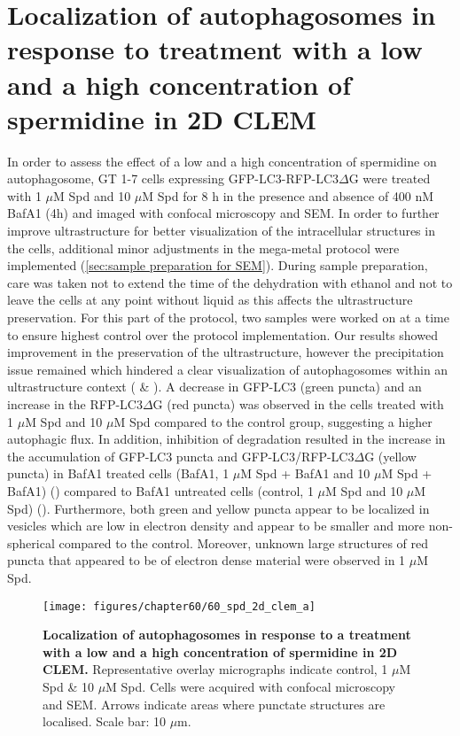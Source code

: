 \section{Localization of autophagosomes in response to treatment with a low and a high concentration of spermidine in 2D CLEM}\label{sec:localization_autophagosomes_low_high_spermidine_2DCLEM}
In order to assess the effect of a low and a high concentration of spermidine on autophagosome, GT 1-7 cells expressing GFP-LC3-RFP-LC3$\Delta$G were treated with 1 $\mu$M Spd and 10 $\mu$M Spd for 8 h in the presence and absence of 400 nM BafA1 (4h) and imaged with confocal microscopy and SEM. In order to further improve ultrastructure for better visualization of the intracellular structures in the cells, additional minor adjustments in the mega-metal protocol were implemented (\cref{sec:sample preparation for SEM}). During sample preparation, care was taken not to extend the time of the dehydration with ethanol and not to leave the cells at any point without liquid as this affects the ultrastructure preservation. For this part of the protocol, two samples were worked on at a time to ensure highest control over the protocol implementation. Our results showed improvement in the preservation of the ultrastructure, however the precipitation issue remained which hindered a clear visualization of autophagosomes within an ultrastructure context ( \& ). A decrease in GFP-LC3 (green puncta) and an increase in the RFP-LC3$\Delta$G (red puncta) was observed in the cells treated with 1 $\mu$M Spd and 10 $\mu$M Spd compared to the control group, suggesting a higher autophagic flux. In addition, inhibition of degradation resulted in the increase in the accumulation of GFP-LC3 puncta and GFP-LC3/RFP-LC3$\Delta$G (yellow puncta) in BafA1 treated cells (BafA1, 1 $\mu$M Spd + BafA1 and 10 $\mu$M Spd + BafA1) () compared to BafA1 untreated cells (control, 1 $\mu$M Spd and 10 $\mu$M Spd) (). Furthermore, both green and yellow puncta appear to be localized in vesicles which are low in electron density and appear to be smaller and more non-spherical compared to the control. Moreover, unknown large structures of red puncta that appeared to be of electron dense material were observed in 1 $\mu$M Spd. 

\begin{landscape}
\begin{figure}[!htbp]
\center
 \texttt{[image: figures/chapter60/60\_spd\_2d\_clem\_a]}
 \caption[Localization of autophagosomes in response to a treatment with a low and a high concentration of spermidine in 2D CLEM]{\textbf{Localization of autophagosomes in response to a treatment with a low and a high concentration of spermidine in 2D CLEM.} Representative overlay micrographs indicate control, 1 $\mu$M Spd \& 10 $\mu$M Spd. Cells were acquired with confocal microscopy and SEM. Arrows indicate areas where punctate structures are localised. Scale bar: 10 $\mu$m.}
 \label{fig:60_spd_2d_clem_a}
\end{figure} 
\end{landscape}

